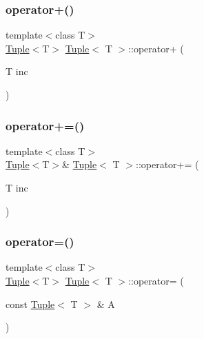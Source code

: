 \subsubsection{\texorpdfstring{operator+()}{operator+()}}
{\footnotesize\ttfamily template$<$class T$>$ \\
\mbox{\hyperlink{class_tuple}{Tuple}}$<$T$>$ \mbox{\hyperlink{class_tuple}{Tuple}}$<$ T $>$\+::operator+ (\begin{DoxyParamCaption}\item[{T}]{inc }\end{DoxyParamCaption})\hspace{0.3cm}{\ttfamily [inline]}}

\mbox{\label{class_tuple_aeace0f594f48529ddf3385cb2f023daf}} 
\subsubsection{\texorpdfstring{operator+=()}{operator+=()}}
{\footnotesize\ttfamily template$<$class T$>$ \\
\mbox{\hyperlink{class_tuple}{Tuple}}$<$T$>$\& \mbox{\hyperlink{class_tuple}{Tuple}}$<$ T $>$\+::operator+= (\begin{DoxyParamCaption}\item[{T}]{inc }\end{DoxyParamCaption})\hspace{0.3cm}{\ttfamily [inline]}}

\mbox{\label{class_tuple_ab47559b59159610317779405337c2b44}} 
\subsubsection{\texorpdfstring{operator=()}{operator=()}}
{\footnotesize\ttfamily template$<$class T$>$ \\
\mbox{\hyperlink{class_tuple}{Tuple}}$<$T$>$ \mbox{\hyperlink{class_tuple}{Tuple}}$<$ T $>$\+::operator= (\begin{DoxyParamCaption}\item[{const \mbox{\hyperlink{class_tuple}{Tuple}}$<$ T $>$ \&}]{A }\end{DoxyParamCaption})\hspace{0.3cm}{\ttfamily [inline]}}




